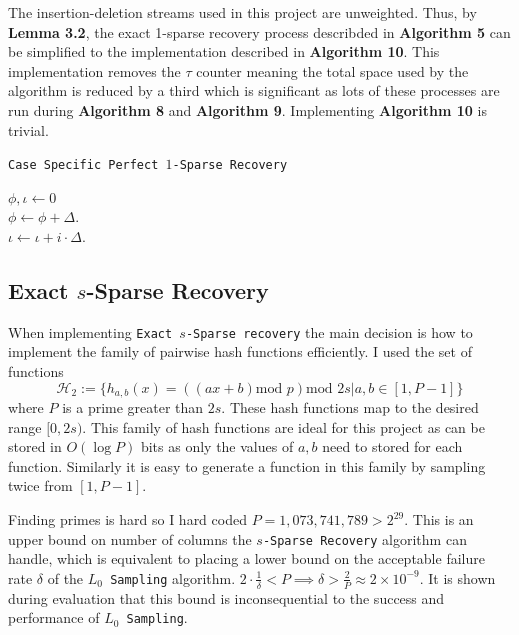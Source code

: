\documentclass[11pt,twoside,a4paper]{report}
\begin{document}
The insertion-deletion streams used in this project are unweighted. Thus, by \textbf{Lemma 3.2}, the exact 1-sparse recovery process describded in \textbf{Algorithm 5} can be simplified to the implementation described in \textbf{Algorithm 10}. This implementation removes the $\tau$ counter meaning the total space used by the algorithm is reduced by a third which is significant as lots of these processes are run during \textbf{Algorithm 8} and \textbf{Algorithm 9}. Implementing \textbf{Algorithm 10} is trivial.

\begin{algorithm}
	\caption{\texttt{Case Specific Perfect $1$-Sparse Recovery}}
	$\phi,\iota\leftarrow0$\\
	 {
		$\phi\leftarrow\phi+\Delta$.\\
		$\iota\leftarrow\iota+i\cdot\Delta$.
	}
\end{algorithm}

\subsection{Exact $s$-Sparse Recovery}

\par When implementing \texttt{Exact $s$-Sparse recovery} the main decision is how to implement the family of pairwise hash functions efficiently. I used the set of functions
$$\mathcal{H}_2:=\{h_{a,b}(x)=((ax+b)\text{mod }p)\text{mod }2s|a,b\in[1,P-1]\}$$
where $P$ is a prime greater than $2s$. These hash functions map to the desired range $[0,2s)$. This family of hash functions are ideal for this project as can be stored in $O(\log P)$ bits as only the values of $a,b$ need to stored for each function. Similarly it is easy to generate a function in this family by sampling twice from $[1,P-1]$.

\par Finding primes is hard so I hard coded $P=1,073,741,789>2^{29}$. This is an upper bound on number of columns the \texttt{$s$-Sparse Recovery} algorithm can handle, which is equivalent to placing a lower bound on the acceptable failure rate $\delta$ of the \texttt{$L_0$ Sampling} algorithm. $2\cdot\frac1\delta<P\implies\delta>\frac2P\approx2\times10^{-9}$. It is shown during evaluation that this bound is inconsequential to the success and performance of \texttt{$L_0$ Sampling}.
\end{document}

